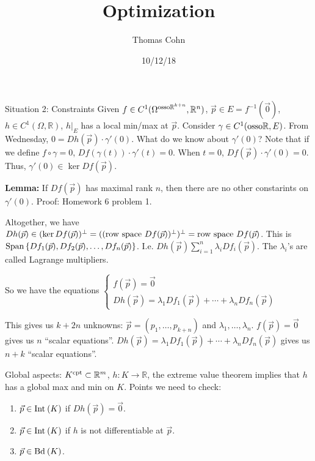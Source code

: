 \documentclass[10pt,letterpaper]{article}
\author{Thomas Cohn}
\title{Optimization}
\date{10/12/18} %
\newcommand{\n}{\hfill\break}
\newcommand{\lemma}[1]{\par\noindent\settowidth{\hangindent}{\textbf{Lemma: }}\textbf{Lemma: }#1}
\newcommand{\ptxt}[1]{\textrm{\textnormal{#1}}}
\newcommand{\set}[1]{\left\{#1\right\}}
\newcommand{\reals}{\mathbb{R}}
\newcommand{\R}{\reals}
\newcommand{\inv}{^{-1}}
\newcommand{\of}{\circ}
\newcommand{\Span}{\ptxt{Span}}
\newcommand{\Int}{\ptxt{Int}\>}
\newcommand{\Bd}{\ptxt{Bd}\>}
\begin{document}
\maketitle
\setlength\RaggedRightParindent{\parindent}
\RaggedRight

\par\noindent Situation 2: Constraints\n
Given $f\in{}C^{1}(\Omega^{\ptxt{osso}\R^{k+n}},\R^{n})$, $\vec{p}\in{}E=f\inv(\vec{0})$, $h\in{}C^{1}(\Omega,\R)$, $h|_{E}$ has a local min/max at $\vec{p}$.\n
Consider $\gamma\in{}C^{1}(\ptxt{osso}\R,E)$. From Wednesday, $0=Dh(\vec{p})\cdot\gamma'(0)$. What do we know about $\gamma'(0)$?\n
Note that if we define $f\of\gamma=0$, $Df(\gamma(t))\cdot\gamma'(t)=0$. When $t=0$, $Df(\vec{p})\cdot\gamma'(0)=0$.\n
Thus, $\gamma'(0)\in\ker{}Df(\vec{p})$.\n

\lemma{If $Df(\vec{p})$ has maximal rank $n$, then there are no other constarints on $\gamma'(0)$.\n
Proof: Homework 6 problem 1.\n}

\par\noindent Altogether, we have $Dh(\vec{p})\in(\ker{}Df(\vec{p}))^{\perp}=((\ptxt{row space }Df(\vec{p}))^{\perp})^{\perp}=\ptxt{row space }Df(\vec{p})$.\n
This is $\Span\set{Df_{1}(\vec{p}), Df_{2}(\vec{p}),\ldots,Df_{n}(\vec{p})}$. I.e. $Dh(\vec{p})\sum_{i=1}^{n}\lambda_{i}Df_{i}(\vec{p})$. The $\lambda_{i}$'s are called Lagrange multipliers.\n

\par\noindent So we have the equations $\left\{\begin{array}{l}f(\vec{p})=\vec{0}\\ Dh(\vec{p})=\lambda_{1}Df_{1}(\vec{p})+\cdots+\lambda_{n}Df_{n}(\vec{p})\end{array}\right.$\n

\par\noindent This gives us $k+2n$ unknowns: $\vec{p}=(p_{1},\ldots,p_{k+n})$ and $\lambda_{1},\ldots,\lambda_{n}$.\n
$f(\vec{p})=\vec{0}$ gives us $n$ ``scalar equations''.\n
$Dh(\vec{p})=\lambda_{1}Df_{1}(\vec{p})+\cdots+\lambda_{n}Df_{n}(\vec{p})$ gives us $n+k$ ``scalar equations''.\n

\par\noindent Global aspects: $K^{\ptxt{cpt}}\subset\R^{m}$, $h:K\to\R$, the extreme value theorem implies that $h$ has a global max and min on $K$. Points we need to check:
\begin{enumerate}
	\item $\vec{p}\in\Int(K)$ if $Dh(\vec{p})=\vec{0}$.
	\item $\vec{p}\in\Int(K)$ if $h$ is not differentiable at $\vec{p}$.
	\item $\vec{p}\in\Bd(K)$.
\end{enumerate}
\end{document}
